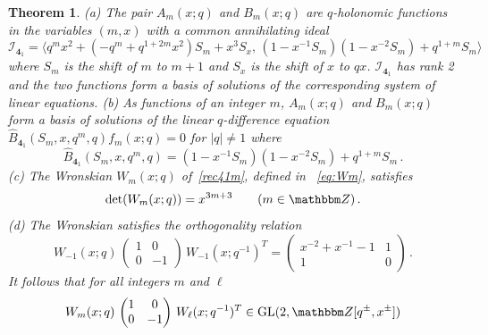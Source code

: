 \documentclass[12pt,reqno]{amsart}
\newtheorem{theorem}{Theorem}
\theoremstyle{definition}
\def\BZ{\mathbbm Z}
\def\calI{\mathcal I}
\def\calI{\mathcal I}
\def\GL{\mathrm{GL}}
\def\Bhat{\widehat{B}}
\def\md{\mathbf}
\newcommand{\knot}[1]{\md{#1}}
\begin{document}
\begin{theorem}
  \label{thm.41b}
  \rm{(a)} The pair $A_m(x;q)$ and $B_m(x;q)$ are $q$-holonomic
  functions in the variables $(m,x)$ with a common annihilating ideal
  \begin{equation}
    \label{ann41}
    \calI_{\knot{4}_1} = \langle q^m x^2 + (-q^m + q^{1 + 2 m} x^2) S_m + x^3
    S_x,  \, 
    (1-x^{-1}S_m)(1-x^{-2}S_m) + q^{1+m} S_m \rangle
  \end{equation}
  where $S_m$ is the shift of $m$ to $m+1$ and $S_x$ is the shift of
  $x$ to $q x$.  $\calI_{\knot{4}_1}$ has rank 2 and the two functions form
  a basis of solutions of the corresponding system of linear equations.
  \newline
  \rm{(b)} As functions of an integer $m$, $A_m(x;q)$ and
  $B_m(x;q)$ form a basis of solutions of the linear $q$-difference
  equation $\Bhat_{\knot{4}_1}(S_m,x,q^m,q) f_m(x;q) = 0$ for $|q| \neq 1$
  where 
  \begin{equation}
    \label{rec41m}
    \Bhat_{\knot{4}_1}(S_m,x,q^m,q) =  (1-x^{-1}S_m)(1-x^{-2}S_m) + q^{1+m} S_m \,.
  \end{equation}
  \rm{(c)} The Wronskian $W_m(x;q)$ of~\eqref{rec41m},
  defined in ~\eqref{eq:Wm}, satisfies
  \begin{equation}
    \label{W410}
    \det(W_m(x;q)) = x^{3m+3} 
    \qquad
    (m \in \BZ) \,.
  \end{equation}
  \rm{(d)} The Wronskian satisfies the orthogonality relation
  \begin{equation}
    \label{WW41b}
    W_{-1}(x;q) \,
    \begin{pmatrix}
      1 & 0 \\
      0 & -1
    \end{pmatrix}
    \,  W_{-1}(x;q^{-1})^T =
    \begin{pmatrix}
      x^{-2}+x^{-1}-1 & 1\\
      1 & 0
    \end{pmatrix} \,.
  \end{equation}
  It follows that for all integers $m$ and $\ell$ 
  \begin{equation}
    \label{WW41}
    W_m(x;q) \,
    \begin{pmatrix}
      1 & 0 \\
      0 & -1
    \end{pmatrix} \, W_\ell(x;q^{-1})^T \in \GL(2,\BZ[q^\pm, x^\pm])

\end{equation}
\end{theorem}
\end{document}
